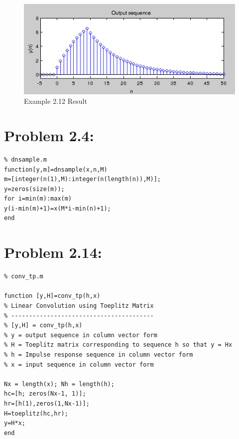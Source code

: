 \documentclass[11pt
  , a4paper
  , article
  , oneside
]{memoir}
\begin{document}
\begin{figure}[h!]
	\centering
	\includegraphics{./images/ex212.png}
	\caption{Example 2.12 Result}
	\label{fig:Example 2.12 Result}
\end{figure}

\chapter{Problem 2.4:}
\begin{lstlisting}[style=termstyle]
% Problem 2.4
% dnsample.m
function[y,m]=dnsample(x,n,M)
m=[integer(n(1),M):integer(n(length(n)),M)];
y=zeros(size(m));
for i=min(m):max(m)
y(i-min(m)+1)=x(M*i-min(n)+1);
end
\end{lstlisting}

\chapter{Problem 2.14:}
\begin{lstlisting}[style=termstyle]
% Problem 2.14
% conv_tp.m

function [y,H]=conv_tp(h,x)
% Linear Convolution using Toeplitz Matrix
% ----------------------------------------
% [y,H] = conv_tp(h,x)
% y = output sequence in column vector form
% H = Toeplitz matrix corresponding to sequence h so that y = Hx
% h = Impulse response sequence in column vector form
% x = input sequence in column vector form

Nx = length(x); Nh = length(h);
hc=[h; zeros(Nx-1, 1)];
hr=[h(1),zeros(1,Nx-1)];
H=toeplitz(hc,hr);
y=H*x;
end

\end{lstlisting}
\end{document}
